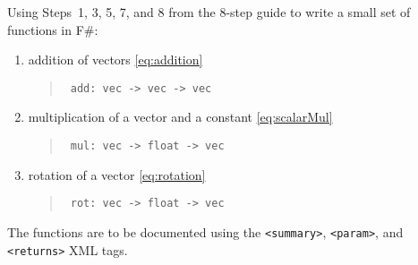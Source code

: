 Using Steps~1, 3, 5, 7, and 8 from the 8-step guide to write a small set of functions in F\#:
\begin{enumerate}
\item addition of vectors  \eqref{eq:addition}
  \begin{quote}
    \mbox{\lstinline! add: vec -> vec -> vec!}
  \end{quote}
\item multiplication of a vector and a constant  \eqref{eq:scalarMul}
  \begin{quote}
    \mbox{\lstinline! mul: vec -> float -> vec!}
  \end{quote}
\item rotation of a vector \eqref{eq:rotation}
  \begin{quote}
    \mbox{\lstinline! rot: vec -> float -> vec!}
  \end{quote}
\end{enumerate}
The functions are to be documented using the \verb|<summary>|, \verb|<param>|, and \verb|<returns>| XML tags.
